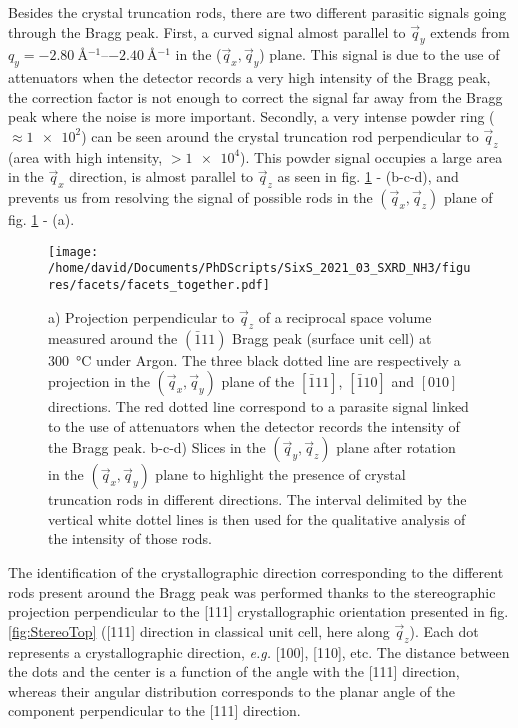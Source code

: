 Besides the crystal truncation rods, there are two different parasitic signals going through the Bragg peak.
First, a curved signal almost parallel to $\vec{q}_y$ extends from $q_y = \qtyrange{-2.80}{-2.40}{\angstrom^{-1}}$ in the ($\vec{q}_x, \vec{q}_y$) plane.
This signal is due to the use of attenuators when the detector records a very high intensity of the Bragg peak, the correction factor is not enough to correct the signal far away from the Bragg peak where the noise is more important.
Secondly, a very intense powder ring ($\approx \num{1e2}$) can be seen around the crystal truncation rod perpendicular to $\vec{q}_z$ (area with high intensity, $> \num{1e4}$).
This powder signal occupies a large area in the $\vec{q}_x$ direction, is almost parallel to $\vec{q}_z$ as seen in fig. \ref{fig:FacetMaps} - (b-c-d), and prevents us from resolving the signal of possible rods in the $(\vec{q}_x, \vec{q}_z)$ plane of fig. \ref{fig:FacetMaps} - (a).

\begin{figure}[!htb]
    \centering
    \texttt{[image: /home/david/Documents/PhDScripts/SixS\_2021\_03\_SXRD\_NH3/figures/facets/facets\_together.pdf]}
    \caption{
        a) Projection perpendicular to $\vec{q}_z$ of a reciprocal space volume measured around the $(\bar{1}11)$ Bragg peak (surface unit cell) at \qty{300}{\degreeCelsius} under Argon.
        The three black dotted line are respectively a projection in the $(\vec{q}_x, \vec{q}_y)$ plane of the $[\bar{1}11]$, $[\bar{1}10]$ and $[010]$ directions.
        The red dotted line correspond to a parasite signal linked to the use of attenuators when the detector records the intensity of the Bragg peak.
        b-c-d) Slices in the $(\vec{q}_y, \vec{q}_z)$ plane after rotation in the $(\vec{q}_x, \vec{q}_y)$ plane to highlight the presence of crystal truncation rods in different directions.
        The interval delimited by the vertical white dottel lines is then used for the qualitative analysis of the intensity of those rods.
    }
    \label{fig:FacetMaps}
\end{figure}

The identification of the crystallographic direction corresponding to the different rods present around the Bragg peak was performed thanks to the stereographic projection perpendicular to the [111] crystallographic orientation presented in fig. \ref{fig:StereoTop} ([111] direction in classical unit cell, here along $\vec{q}_z$).
Each dot represents a crystallographic direction, \textit{e.g.} [100], [110], etc.
The distance between the dots and the center is a function of the angle with the [111] direction, whereas their angular distribution corresponds to the planar angle of the component perpendicular to the [111] direction.

